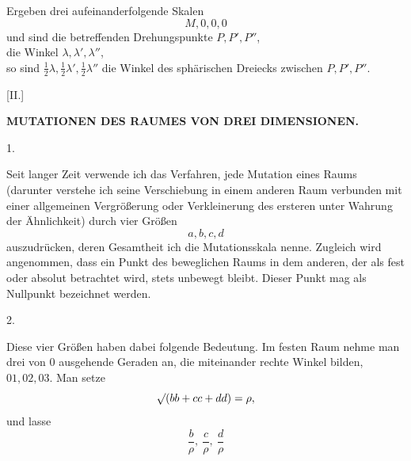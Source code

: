 \par
{}%
Ergeben drei aufeinanderfolgende Skalen
\[
M,0,0,0
\]
und sind die betreffenden Drehungspunkte $P,P',P''$,\\
\hspace*{5em}die Winkel $\lambda,\lambda',\lambda''$,\\
so sind $\tfrac12\lambda,\tfrac12\lambda',\tfrac12\lambda''$ die Winkel des sphärischen Dreiecks zwischen $P,P',P''$.

\begin{center}[II.]\end{center}
\begin{center}\bfseries MUTATIONEN DES RAUMES VON DREI DIMENSIONEN.\end{center}
\begin{center}1.\end{center}

Seit langer Zeit verwende ich das Verfahren, jede Mutation eines Raums (darunter verstehe ich seine Verschiebung in einem anderen Raum verbunden mit einer allgemeinen Vergrößerung oder Verkleinerung des ersteren unter Wahrung der Ähnlichkeit) durch vier Größen
\[
a,b,c,d
\]
auszudrücken, deren Gesamtheit ich die Mutationsskala nenne. Zugleich wird angenommen, dass ein Punkt des beweglichen Raums in dem anderen, der als fest oder absolut betrachtet wird, stets unbewegt bleibt. Dieser Punkt mag als Nullpunkt bezeichnet werden.

\begin{center}2.\end{center}

Diese vier Größen haben dabei folgende Bedeutung. Im festen Raum nehme man drei von $0$ ausgehende Geraden an, die miteinander rechte Winkel bilden, $01,02,03$. Man setze
\[
\mathord{\surd}(bb+cc+dd)=\rho,
\]
und lasse
\[
\frac b\rho,\ \frac c\rho,\ \frac d\rho
\]
